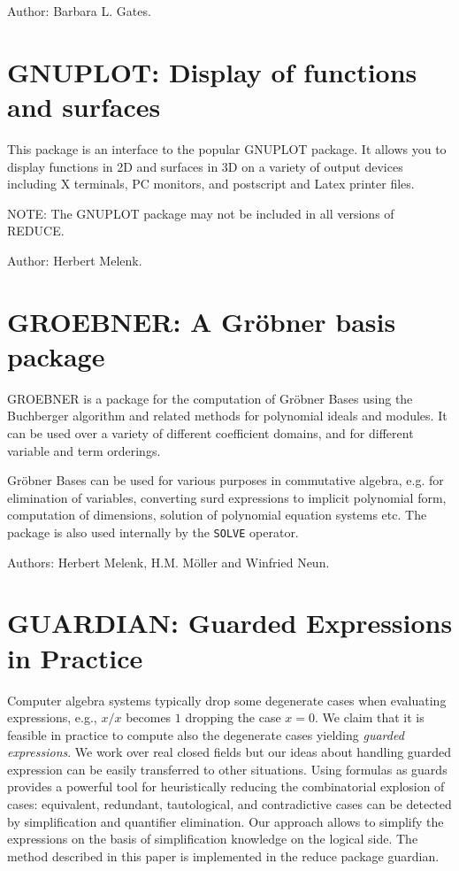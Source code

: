 Author: Barbara L. Gates.

\section{GNUPLOT: Display of functions and surfaces}

This package is an interface to the popular GNUPLOT package.
It allows you to display functions in 2D and surfaces in 3D
on a variety of output devices including X terminals, PC monitors, and
postscript and Latex printer files.

NOTE: The GNUPLOT package may not be included in all versions of REDUCE.

Author: Herbert Melenk.

\section{GROEBNER: A Gr\"obner basis package} 
\label{GROEBNER}

GROEBNER  is a package for the computation of Gr\"obner
Bases using the Buchberger algorithm and related methods
for polynomial ideals and modules.  It can be used over a variety of
different coefficient domains, and for different variable and term
orderings.

Gr\"obner Bases can be used for various purposes in commutative
algebra, e.g. for elimination of variables,
converting surd expressions to implicit polynomial form,
computation of dimensions, solution of polynomial equation systems 
 etc. 
The package is also used internally by the {\tt SOLVE}  
operator.

Authors: Herbert Melenk, H.M. M\"oller and Winfried Neun.


\section{GUARDIAN: Guarded Expressions in Practice}
\label{GUARDIAN}

Computer algebra systems typically drop some degenerate cases when
evaluating expressions, e.g., $x/x$ becomes $1$ dropping the case
$x=0$. We claim that it is feasible in practice to compute also the
degenerate cases yielding {\em guarded expressions}. We work over real
closed fields but our ideas about handling guarded expression can be
easily transferred to other situations. Using formulas as guards
provides a powerful tool for heuristically reducing the combinatorial
explosion of cases: equivalent, redundant, tautological, and
contradictive cases can be detected by simplification and quantifier
elimination. Our approach allows to simplify the expressions on the
basis of simplification knowledge on the logical side. The method
described in this paper is implemented in the {\sc reduce} package
{\sc guardian}.

